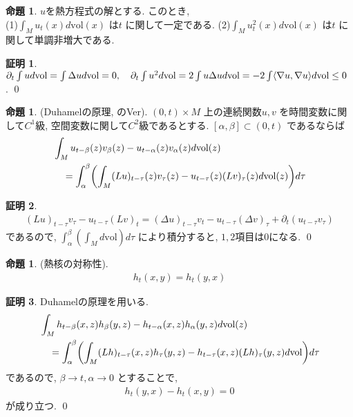 \documentclass[twocolumn, landscape, a4paper , 8pt, fleqn, titlepage ]{jsarticle}
\theoremstyle{definition}
\newtheorem{prop}[dfn]{命題}
\newtheorem*{pf*}{証明}
\newcommand{\paren}[1]{\mleft( #1\mright )}
\newcommand{\tbra}[1]{\mleft\langle#1\mright\rangle}
\newcommand{\vol}{\textrm{vol}}
\renewcommand{\-}{\hyphen}
\begin{document}
\begin{prop}$u$を熱方程式の解とする. このとき, \\
(1)$\int_M u_t (x) d\vol(x)$ は$t$ に関して一定である. (2)$\int_M u^2_t (x) d \vol (x)$ は$t$ に関して単調非増大である.
\end{prop}
\begin{pf*}
$\partial_t \int u d \vol = \int \Delta u d \vol = 0, \quad \partial_t \int u^2 d \vol = 2 \int u \Delta u d \vol = - 2  \int \tbra{\nabla u, \nabla u} d \vol \leq 0$ .
\qed
\end{pf*}

\begin{prop}(Duhamelの原理, のVer).
$(0,t) \times M$ 上の連続関数$u,v$ を時間変数に関して$C^1$級, 空間変数に関して$C^2$級であるとする. $[\alpha, \beta] \subset (0,t)$ であるならば
\begin{align*} &\int_M u_{t - \beta} (z) v_\beta (z) - u_{t -\alpha} (z) v_\alpha (z) d\vol(z) \\ &\quad = \int_\alpha^\beta \paren {\int_M (Lu)_{t - \tau} (z) v_\tau (z) - u_{t-\tau}(z)(Lv)_\tau (z) d \vol(z) } d \tau \end{align*}
\end{prop}
\begin{pf*}
\begin{align*} (Lu)_{t - \tau} v_\tau - u_{t- \tau} (Lv)_t = (\Delta u)_{t- \tau} v_t - u_{t- \tau} (\Delta v)_\tau + \partial_t (u_{t-\tau} v_\tau)\end{align*}
であるので, $\int_\alpha^\beta(\int_M d \vol) d \tau$ により積分すると, $1,2$項目は$0$になる. 
\qed
\end{pf*}

\begin{prop}(熱核の対称性).
\begin{align*} h_t (x,y) = h_t (y,x) \end{align*}
\end{prop}
\begin{pf*}
Duhamelの原理を用いる.
\begin{align*} &\int_M h_{t - \beta} (x, z) h_\beta (y, z) - h_{t -\alpha} (x, z) h_\alpha (y, z) d\vol(z)
\\ &\quad = \int_\alpha^\beta \paren {\int_M (Lh)_{t - \tau} (x, z) h_\tau (y, z) - h_{t-\tau}(x, z)(Lh)_\tau (y, z) d \vol } d \tau  \end{align*}
であるので, $\beta \rightarrow t, \alpha \rightarrow 0$ とすることで, 
\begin{align*} h_t( y,x) - h_t (x,y) = 0 \end{align*} 
が成り立つ.
\qed
\end{pf*}
\end{document}
